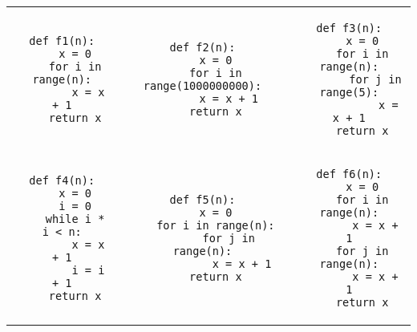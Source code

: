 \documentclass[11pt,a4paper]{exam}
\begin{document}
\begin{questions}
\begin{spacing}{1}
		\noindent
		\begin{tabular}{c c c}
			\begin{minipage}{\lgcode\linewidth}
				\begin{verbatim}
def f1(n):
    x = 0
    for i in range(n):
        x = x + 1
    return x
				\end{verbatim}
			\end{minipage}
			&
			\begin{minipage}{\lgcode\linewidth}
				\begin{verbatim}
def f2(n):
    x = 0
    for i in range(1000000000):
        x = x + 1
    return x
				\end{verbatim}
			\end{minipage}
			&
			\begin{minipage}{\lgcode\linewidth}
				\begin{verbatim}
def f3(n):
    x = 0
    for i in range(n):
        for j in range(5):
            x = x + 1
    return x
				\end{verbatim}
			\end{minipage}
			\\
			\begin{minipage}{\lgcode\linewidth}
				\begin{verbatim}
def f4(n):
    x = 0
    i = 0
    while i * i < n:
        x = x + 1
        i = i + 1
    return x
				\end{verbatim}
			\end{minipage}
			&
			\begin{minipage}{\lgcode\linewidth}
				\begin{verbatim}
def f5(n):
    x = 0
    for i in range(n):
        for j in range(n):
            x = x + 1
    return x
				\end{verbatim}
			\end{minipage}
			&
			\begin{minipage}{\lgcode\linewidth}
				\begin{verbatim}
def f6(n):
    x = 0
    for i in range(n):
        x = x + 1
    for j in range(n):
        x = x + 1
    return x
				\end{verbatim}
			\end{minipage}
		\end{tabular}
		

\end{spacing}
\end{questions}
\end{document}
